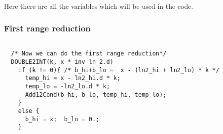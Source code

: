 Here there are all the variables which will be used in the code.

\subsubsection{First range reduction}

\begin{lstlisting}[caption={Procedure \texttt{cosh\_quick} - first range reduction},firstnumber=19]

  /* Now we can do the first range reduction*/
  DOUBLE2INT(k, x * inv_ln_2.d)
    if (k != 0){ /* b_hi+b_lo =  x - (ln2_hi + ln2_lo) * k */
      temp_hi = x - ln2_hi.d * k;                                         
      temp_lo = -ln2_lo.d * k;                                          
      Add12Cond(b_hi, b_lo, temp_hi, temp_lo); 
    }
    else {                                                         
      b_hi = x;  b_lo = 0.;
    }                                                               
\end{lstlisting}

